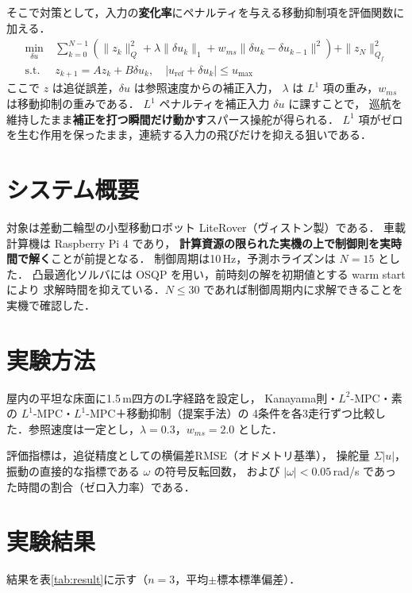 \documentclass[a4jsme,9pt,dvipdfmx]{jsmepaper_robomec}
\begin{document}
そこで対策として，入力の\textbf{変化率}にペナルティを与える移動抑制項を評価関数に加える．
\begin{equation}
  \begin{split}
    \min_{\delta u} \ & \sum_{k=0}^{N-1} \left( \|z_k\|_Q^2
      + \lambda \|\delta u_k\|_1
      + w_{ms} \|\delta u_k - \delta u_{k-1}\|^2 \right) + \|z_N\|_{Q_f}^2 \\
    \mathrm{s.t.} \ & z_{k+1} = A z_k + B \delta u_k, \quad
      |u_{\mathrm{ref}} + \delta u_k| \le u_{\max}
  \end{split}
\end{equation}
ここで $z$ は追従誤差，$\delta u$ は参照速度からの補正入力，
$\lambda$ は $L^1$ 項の重み，$w_{ms}$ は移動抑制の重みである．
$L^1$ ペナルティを補正入力 $\delta u$ に課すことで，
巡航を維持したまま\textbf{補正を打つ瞬間だけ動かす}スパース操舵が得られる．
$L^1$ 項がゼロを生む作用を保ったまま，連続する入力の飛びだけを抑える狙いである．

\section{システム概要}
対象は差動二輪型の小型移動ロボット LiteRover（ヴィストン製）である．
車載計算機は Raspberry Pi 4 であり，
\textbf{計算資源の限られた実機の上で制御則を実時間で解く}ことが前提となる．
制御周期は10\,Hz，予測ホライズンは $N=15$ とした．
凸最適化ソルバには OSQP を用い，前時刻の解を初期値とする warm start により
求解時間を抑えている．$N\le30$ であれば制御周期内に求解できることを実機で確認した．

\section{実験方法}
屋内の平坦な床面に1.5\,m四方のL字経路を設定し，
Kanayama則・$L^2$-MPC・素の $L^1$-MPC・$L^1$-MPC＋移動抑制（提案手法）の
4条件を各3走行ずつ比較した．参照速度は一定とし，$\lambda=0.3$，$w_{ms}=2.0$ とした．

評価指標は，追従精度としての横偏差RMSE（オドメトリ基準），
操舵量 $\Sigma|u|$，振動の直接的な指標である $\omega$ の符号反転回数，
および $|\omega|<0.05$\,rad/s であった時間の割合（ゼロ入力率）である．

\section{実験結果}
結果を表\ref{tab:result}に示す（$n=3$，平均$\pm$標本標準偏差）．
\end{document}
